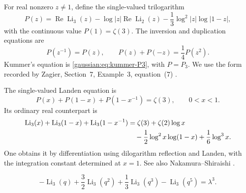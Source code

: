 For real nonzero $z\ne1$, define the single-valued trilogarithm
\[
P(z)=\operatorname{Re}\operatorname{Li}_3(z)
 -\log|z|\operatorname{Re}\operatorname{Li}_2(z)
 -\frac13\log^2|z|\log|1-z|,
\]
with the continuous value $P(1)=\zeta(3)$.
The inversion and duplication equations are
\[
P(z^{-1})=P(z),\qquad P(z)+P(-z)=\frac14P(z^2).
\]
Kummer's equation is \eqref{gaussian:eq:kummer-P3}, with $P=P_3$.
We use the form recorded by Zagier, Section~7, Example~3,
equation~(7) \cite{gaussian:Zagier}.

The single-valued Landen equation is
\[
P(x)+P(1-x)+P(1-x^{-1})=\zeta(3),\qquad0<x<1.
\]
Its ordinary real counterpart is
\begin{align}
\operatorname{Li}_3(x)+\operatorname{Li}_3(1-x)
 +\operatorname{Li}_3(1-x^{-1})
 &=\zeta(3)+\zeta(2)\log x\notag\\
 &\quad-\frac12\log^2x\log(1-x)+\frac16\log^3x.
\label{rigid:eq:plastic-ordinary-Landen}
\end{align}
One obtains it by differentiation using dilogarithm reflection and
Landen, with the integration constant determined at $x=1$.
See also Nakamura--Shiraishi \cite{gaussian:NakamuraShiraishi}.

\begin{theorem}
\label{rigid:thm:plastic-trilog}
\begin{equation}
-\operatorname{Li}_3(q)+\frac32\operatorname{Li}_3(q^2)
 +\frac13\operatorname{Li}_3(q^3)-\operatorname{Li}_3(q^5)
=\lambda^3.
\label{rigid:eq:plastic-trilog-proved}
\end{equation}
\end{theorem}

